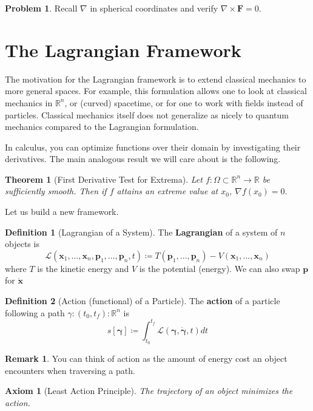 \documentclass[12pt]{article}
\newcommand{\R}{\mathbb{R}}
\newtheorem{theorem}{Theorem}[part]
\newtheorem{axiom}{Axiom}[part]
\theoremstyle{definition}
\newtheorem{definition}{Definition}[part]
\newtheorem{remark}{Remark}[part]
\newtheorem{problem}{Problem}[part]
\begin{document}
\begin{problem}
Recall $\nabla$ in spherical coordinates and verify $\nabla \times \mathbf{F}=0$.
\end{problem}

\section{The Lagrangian Framework}
The motivation for the Lagrangian framework is to extend classical mechanics to more general spaces.  For example, this formulation allows one to look at classical mechanics in $\R^n$, or (curved) spacetime, or for one to work with fields instead of particles.  Classical mechanics itself does not generalize as nicely to quantum mechanics compared to the Lagrangian formulation.

In calculus, you can optimize functions over their domain by investigating their derivatives.  The main analogous result we will care about is the following.

\begin{theorem}[First Derivative Test for Extrema]
Let $f\colon \Omega \subset \R^n \to \R$ be sufficiently smooth. Then if $f$ attains an extreme value at $x_0$, $\nabla f(x_0)=0.$
\end{theorem}

Let us build a new framework.  

\begin{definition}[Lagrangian of a System]
The \textbf{Lagrangian} of a system of $n$ objects is
\[
\mathcal{L}(\mathbf{x}_1,\dots,\mathbf{x}_n,\mathbf{p}_1,\dots,\mathbf{p}_n,t)\coloneqq T(\mathbf{p}_1,\dots,\mathbf{p}_n)-V(\mathbf{x}_1,\dots,\mathbf{x}_n)
\]
where $T$ is the kinetic energy and $V$ is the potential (energy). We can also swap $\mathbf{p}$ for $\Dot{\mathbf{x}}$
\end{definition}

\begin{definition}[Action (functional) of a Particle]
The \textbf{action} of a particle following a path $\gamma \colon (t_0,t_f) \colon \R^n$ is
\[
s[\mathbf{\gamma}]\coloneqq \int_{t_0}^{t_f} \mathcal{L}(\mathbf{\gamma},\mathbf{\Dot{\gamma}},t)dt
\]
\end{definition}

\begin{remark}
You can think of action as the amount of energy cost an object encounters when traversing a path. 
\end{remark}

\begin{axiom}[Least Action Principle]
The trajectory of an object minimizes the action.
\end{axiom}
\end{document}
